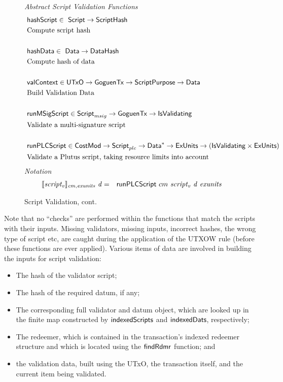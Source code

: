 \begin{figure*}[htb]
  \emph{Abstract Script Validation Functions}
  \begin{align*}
     &\mathsf{hashScript} \in  ~\mathsf{Script}\to \mathsf{ScriptHash} \\
     &\text{Compute script hash} \\~\\
     &\mathsf{hashData} \in  ~\mathsf{Data} \to \mathsf{DataHash} \\
     &\text{Compute hash of data} \\~\\
     &\mathsf{valContext} \in  \mathsf{UTxO} \to \mathsf{GoguenTx} \to \mathsf{ScriptPurpose} \to \mathsf{Data} \\
     &\text{Build Validation Data} \\~\\
     &\mathsf{runMSigScript} \in\mathsf{Script}_{msig}\to \mathsf{GoguenTx} \to \mathsf{IsValidating}  \\
     &\text{Validate a multi-signature script} \\~\\
     &\mathsf{runPLCScript} \in \mathsf{CostMod} \to\mathsf{Script}_{plc} \to
    \mathsf{Data}^{*} \to \mathsf{ExUnits} \to (\mathsf{IsValidating} \times \mathsf{ExUnits}) \\
     &\text{Validate a Plutus script, taking resource limits into account}
  \end{align*}
  \emph{Notation}
  \begin{align*}
    \llbracket \mathit{script_v} \rrbracket_{\mathit{cm},\mathit{exunits}}~\mathit{d}
    &=& \mathsf{runPLCScript} ~{cm}~\mathit{script_v}~\mathit{d}~\mathit{exunits}
  \end{align*}
  \caption{Script Validation, cont.}
  \label{fig:defs:functions-valid}
\end{figure*}

Note that no ``checks'' are performed within the functions that match the
scripts with their inputs. Missing validators, missing inputs, incorrect hashes, the wrong type of script etc,
are caught during the application of the UTXOW rule (before these functions are ever applied).
%
Various items of data are involved in building the inputs for script validation:

\begin{itemize}
\item The hash of the validator script;

\item The hash of the required datum, if any;

\item The corresponding full validator and datum object, which are looked up in the finite map
constructed by $\mathsf{indexedScripts}$ and $\mathsf{indexedDats}$, respectively;

\item The redeemer, which is contained in the transaction's indexed redeemer structure
and which is located using the $\mathsf{findRdmr}$ function; and

\item the validation data, built using the UTxO, the transaction itself,
and the current item being validated.
\end{itemize}



